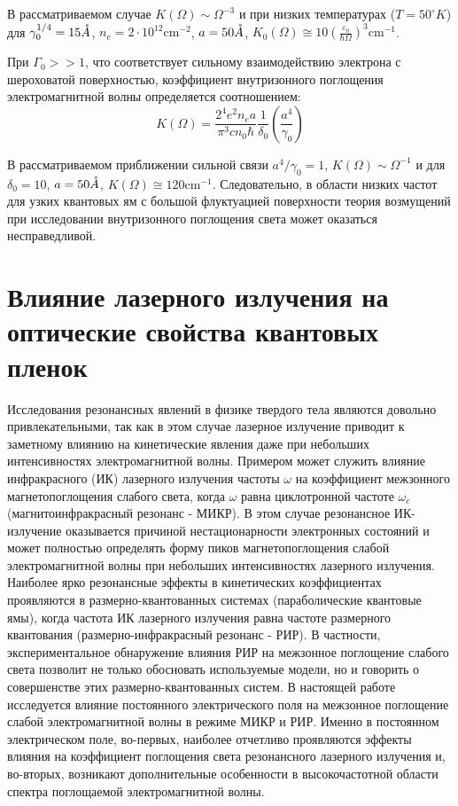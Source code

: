 {В рассматриваемом случае $K(\Omega )\sim \Omega ^{-3} $ и при низких температурах ($T=50^{\circ } K$) для $\gamma _{0} ^{1/4} =15 \AA$, $n_{e} =2\cdot 10^{12} \text{cm}^{-2} $, $a=50 \AA$, $K_{0} (\Omega )\cong 10\left(\frac{\varepsilon _{0} }{\hbar \Omega } \right)^{3} \text{cm}^{-1} $.

При $\Gamma _{0} >> 1$, что соответствует сильному взаимодействию электрона с шероховатой поверхностью, коэффициент внутризонного поглощения электромагнитной волны определяется соотношением:
\begin{equation} \label{eq:21_40}
K(\Omega )=\frac{2^{4} e^{2} n_{e} a}{\pi ^{3} cn_{0} \hbar } \frac{1}{\delta _{0} } \left(\frac{a^{4} }{\gamma _{0} } \right)
\end{equation} 

В рассматриваемом приближении сильной связи $a^{4} /\gamma _{0} =1$, $K(\Omega )\sim \Omega ^{-1} $ и для $\delta _{0} =10$, $a=50 \AA$, $K(\Omega )\cong 120 \text{cm}^{-1} $. Следовательно, в области низких частот для узких квантовых ям с большой флуктуацией поверхности теория возмущений при исследовании внутризонного поглощения света может оказаться несправедливой.
	

\section{Влияние лазерного излучения на оптические свойства квантовых пленок} \label{sect2_2}

Исследования резонансных явлений в физике твердого тела являются довольно привлекательными, так как в этом случае лазерное излучение приводит к заметному влиянию на кинетические явления даже при небольших интенсивностях электромагнитной волны. Примером может служить влияние инфракрасного (ИК) лазерного излучения частоты $\omega $ на коэффициент межзонного магнетопоглощения слабого света, когда $\omega $ равна циклотронной частоте $\omega _{c} $ (магнитоинфракрасный резонанс - МИКР). В этом случае резонансное ИК-излучение оказывается причиной нестационарности электронных состояний и может полностью определять форму пиков магнетопоглощения слабой электромагнитной волны при небольших интенсивностях лазерного излучения. Наиболее ярко резонансные эффекты в кинетических коэффициентах проявляются в размерно-квантованных системах (параболические квантовые ямы), когда частота ИК лазерного излучения равна частоте размерного квантования (размерно-инфракрасный резонанс - РИР). В частности, экспериментальное обнаружение влияния РИР на межзонное поглощение слабого света позволит не только обосновать используемые модели, но и говорить о совершенстве этих размерно-квантованных систем. В настоящей работе исследуется влияние постоянного электрического поля на межзонное поглощение слабой электромагнитной волны в режиме МИКР и РИР. Именно в постоянном электрическом поле, во-первых, наиболее отчетливо проявляются эффекты влияния на коэффициент поглощения света резонансного лазерного излучения и, во-вторых, возникают дополнительные особенности в высокочастотной области спектра поглощаемой электромагнитной волны.

}
